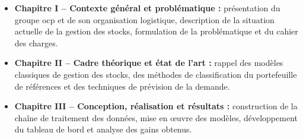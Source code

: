 \begin{itemize}
  \item \textbf{Chapitre I -- Contexte général et problématique :} présentation
    du groupe \gls{ocp} et de son organisation logistique, description de la
    situation actuelle de la gestion des stocks, formulation de la
    problématique et du cahier des charges.
  \item \textbf{Chapitre II -- Cadre théorique et état de l'art :} rappel des
    modèles classiques de gestion des stocks, des méthodes de classification
    du portefeuille de références et des techniques de prévision de la demande.
  \item \textbf{Chapitre III -- Conception, réalisation et résultats :}
    construction de la chaîne de traitement des données, mise en \oe uvre des
    modèles, développement du tableau de bord et analyse des gains obtenus.
\end{itemize}
